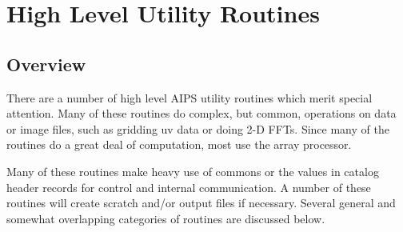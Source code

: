 \setcounter{chapter}{6} %
\chapter{High Level Utility Routines}
\setcounter{page}{1}

\section{Overview}
There are a number of high level AIPS utility routines which merit
special attention.  Many of these routines do complex, but common,
operations on data or image files, such as gridding uv data or doing
2-D FFTs.  Since many of the routines do a great deal of computation,
most use the array processor.

Many of these routines make heavy use of commons or the values in
catalog header records for control and internal communication.  A
number of these routines will create scratch and/or output files if
necessary. Several general and somewhat overlapping categories of
routines  are discussed below.

